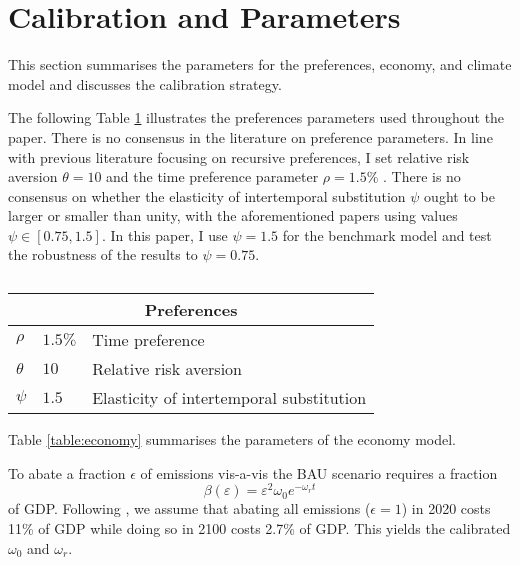 \documentclass[../../main.tex]{subfiles}
\begin{document}
\section{Calibration and Parameters} \label{appendix:calibration}

This section summarises the parameters for the preferences, economy, and climate model and discusses the calibration strategy.

The following Table \ref{table:preferences} illustrates the preferences parameters used throughout the paper. There is no consensus in the literature on preference parameters. In line with previous literature focusing on recursive preferences, I set relative risk aversion $\theta = 10$ \citep{ackerman_epsteinzin_2013,crost_optimal_2013,lontzek_stochastic_2015} and the time preference parameter $\rho = 1.5\%$ \citep{nordhaus_estimates_2014}. There is no consensus on whether the elasticity of intertemporal substitution $\psi$ ought to be larger or smaller than unity, with the aforementioned papers using values $\psi \in [0.75, 1.5]$. In this paper, I use $\psi = 1.5$ for the benchmark model and test the robustness of the results to $\psi = 0.75$.

\begin{table}[htbp]
    \centering
    \begin{tabular}{ |p{1cm}||p{3cm}|p{8cm}|}
        \hline
        \multicolumn{3}{|c|}{Preferences} \\
        \hline
        $\rho$ & $1.5\%$ & Time preference \\
        $\theta$ & $10$ & Relative risk aversion \\
        $\psi$ & $1.5$ & Elasticity of intertemporal substitution \\
        \hline
    \end{tabular}
    \caption{}
    \label{table:preferences}
\end{table}

Table \ref{table:economy} summarises the parameters of the economy model. 

To abate a fraction $\epsilon$ of emissions vis-a-vis the BAU scenario requires a fraction \begin{equation}
    \beta(\varepsilon) = \varepsilon^2 
    \omega_0 e^{-\omega_r t}
\end{equation} of GDP. Following \citep{nordhaus_revisiting_2017}, we assume that abating all emissions ($\epsilon = 1$) in 2020 costs 11\% of GDP while doing so in 2100 costs 2.7\% of GDP. This yields the calibrated $\omega_0$ and $\omega_r$. %
\end{document}
